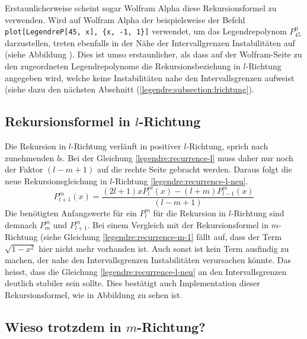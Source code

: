 
Erstaunlicherweise scheint sogar Wolfram Alpha \cite{legendre:wolfram-alpha} diese Rekursionsformel zu verwenden.
Wird auf Wolfram Alpha der beispielsweise der Befehl \verb+plot[LegendreP[45, x], {x, -1, 1}]+ verwendet, um das Legendrepolynom $P^{0}_{45}$ darzustellen, treten ebenfalls in der Nähe der Intervallgrenzen Instabilitäten auf (siehe Abbildung ).
Dies ist umso erstaunlicher, als dass auf der Wolfram-Seite zu den zugeordneten Legendrepolynome \cite{legendre:assoc-legendre-poly-wolfram} die Rekursionsbeziehung in $l$-Richtung angegeben wird, welche keine Instabilitäten nahe den Intervallsgrenzen aufweist (siehe dazu den nächsten Abschnitt (\ref{legendre:subsection:lrichtung}).

\subsection{Rekursionsformel in $l$-Richtung
\label{legendre:subsection:lrichtung}}
Die Rekursion in $l$-Richtung verläuft in positiver $l$-Richtung, sprich nach zunehmenden $l$s.
Bei der Gleichung \eqref{legendre:recurrence-l} muss daher nur noch der Faktor $(l-m+1)$ auf die rechte Seite gebracht werden.
Daraus folgt die neue Rekursionsgleichung in $l$-Richtung \eqref{legendre:recurrence-l-neu}.
\begin{equation}
P^{m}_{l+1}(x)
= \frac{(2l+1)xP^{m}_{l}(x)-(l+m)P^{m}_{l-1}(x)}{(l-m+1)} 
\label{legendre:recurrence-l-neu}
\end{equation}
Die benötigten Anfangswerte für ein $P^{m}_{l}$ für die Rekursion in $l$-Richtung sind demnach $P^{m}_{m}$ und $P^{m}_{l+1}$.
Bei einem Vergleich mit der Rekursionsformel in $m$-Richtung (siehe Gleichung \eqref{legendre:recurrence-m-1} fällt auf, dass der Term $\sqrt{1-x^2}$ hier nicht mehr vorhanden ist.
Auch sonst ist kein Term ausfindig zu machen, der nahe den Intervallsgrenzen Instabilitäten verursachen könnte.
Das heisst, dass die Gleichung \eqref{legendre:recurrence-l-neu} an den Intervallsgrenzen deutlich stabiler sein sollte.
Dies bestätigt auch Implementation dieser Rekursionsformel, wie in Abbildung  zu sehen ist.




\subsection{Wieso trotzdem in $m$-Richtung?
\label{legendre:subsection:wiesom}}





